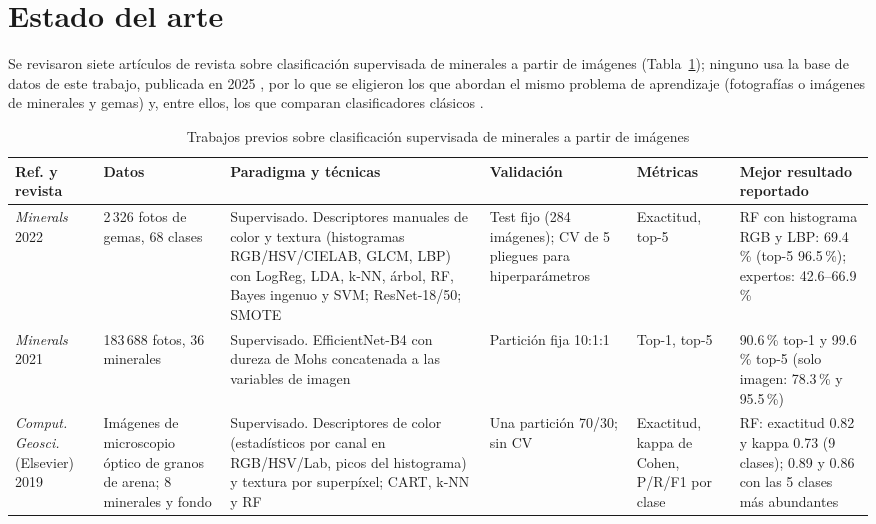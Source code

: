 \documentclass[journal]{IEEEtran}
\begin{document}
\section{Estado del arte}\label{sec:sota}
Se revisaron siete artículos de revista sobre clasificación supervisada de minerales a partir de imágenes (Tabla~\ref{tab:sota}); ninguno usa la base de datos de este trabajo, publicada en 2025 \cite{hfdata}, por lo que se eligieron los que abordan el mismo problema de aprendizaje (fotografías o imágenes de minerales y gemas) y, entre ellos, los que comparan clasificadores clásicos \cite{chow2022,maitre2019}.

\begin{table}[!t]
\caption{Trabajos previos sobre clasificación supervisada de minerales a partir de imágenes}
\label{tab:sota}
\centering\scriptsize
\setlength{\tabcolsep}{3pt}
\renewcommand{\arraystretch}{1.08}
\begin{tabular}{@{}p{1.55cm} p{2.25cm} p{4.0cm} p{1.9cm} p{1.5cm} p{4.4cm}@{}}
\toprule
Ref. y revista & Datos & Paradigma y técnicas & Validación & Métricas & Mejor resultado reportado\\
\midrule
\cite{chow2022}\newline\emph{Minerals} 2022 & 2\,326 fotos de gemas, 68 clases & Supervisado. Descriptores manuales de color y textura (histogramas RGB/HSV/CIELAB, GLCM, LBP) con LogReg, LDA, k-NN, árbol, RF, Bayes ingenuo y SVM; ResNet-18/50; SMOTE & Test fijo (284 imágenes); CV de 5 pliegues para hiperparámetros & Exactitud, top-5 & RF con histograma RGB y LBP: 69.4\,\% (top-5 96.5\,\%); expertos: 42.6--66.9\,\%\\
\cite{zeng2021}\newline\emph{Minerals} 2021 & 183\,688 fotos, 36 minerales & Supervisado. EfficientNet-B4 con dureza de Mohs concatenada a las variables de imagen & Partición fija 10:1:1 & Top-1, top-5 & 90.6\,\% top-1 y 99.6\,\% top-5 (solo imagen: 78.3\,\% y 95.5\,\%)\\
\cite{maitre2019}\newline\emph{Comput. Geosci.} (Elsevier) 2019 & Imágenes de microscopio óptico de granos de arena; 8 minerales y fondo & Supervisado. Descriptores de color (estadísticos por canal en RGB/HSV/Lab, picos del histograma) y textura por superpíxel; CART, k-NN y RF & Una partición 70/30; sin CV & Exactitud, kappa de Cohen, P/R/F1 por clase & RF: exactitud 0.82 y kappa 0.73 (9 clases); 0.89 y 0.86 con las 5 clases más abundantes\\

\end{tabular}
\end{table}
\end{document}
